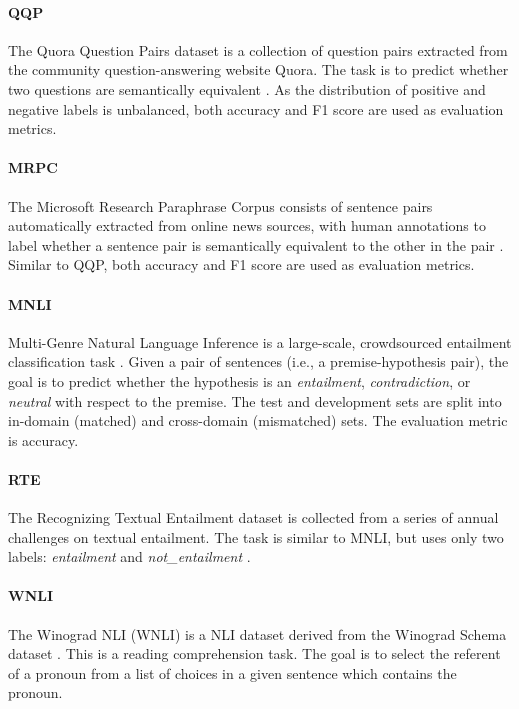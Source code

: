 \paragraph{QQP}
The Quora Question Pairs dataset is a collection of question pairs extracted from the community question-answering website Quora. The task is to predict whether two questions are semantically equivalent \cite{chen2018quora}. 
As the distribution of positive and negative labels is unbalanced, both accuracy and F1 score are used as evaluation metrics.

\paragraph{MRPC} The Microsoft Research Paraphrase Corpus consists of sentence pairs automatically extracted from online news sources, with human annotations
to label whether a sentence pair is semantically equivalent to the other in the pair \cite{mrpc2005}. 
Similar to QQP, both accuracy and F1 score are used as evaluation metrics.

\paragraph{MNLI}
Multi-Genre Natural Language Inference is a large-scale, crowdsourced entailment classification task \cite{mnli2017}.
Given a pair of sentences (i.e., a premise-hypothesis pair), the goal is to predict whether the hypothesis is an \textit{entailment}, \textit{contradiction}, or
\textit{neutral} with respect to the premise. 
The test and development sets are split into in-domain (matched) and cross-domain (mismatched) sets. The evaluation metric is accuracy.

\paragraph{RTE}
The Recognizing Textual Entailment dataset is collected from a series of annual challenges on textual entailment. The task is similar to MNLI, but uses only two labels: \textit{entailment} and \textit{not\_entailment} \cite{wang2018glue}.

\paragraph{WNLI}
The Winograd NLI (WNLI) is a NLI dataset derived from the Winograd Schema dataset \cite{winograd2012}. This is a reading comprehension task. The goal is to select the referent of a pronoun from a list of choices in a given sentence which contains the pronoun.

